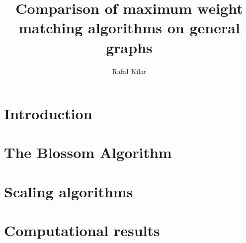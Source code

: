 \documentclass{report}
\title{Comparison of maximum weight matching algorithms on general graphs}
\author{Rafał Kilar}
\begin{document}

\pagebreak


\tableofcontents
\pagebreak

\chapter{Introduction}




\chapter{The Blossom Algorithm}\label{chap:blossom}


\chapter{Scaling algorithms}\label{chap:scaling}


\chapter{Computational results}\label{chap:results}


\printbibliography
\end{document}
